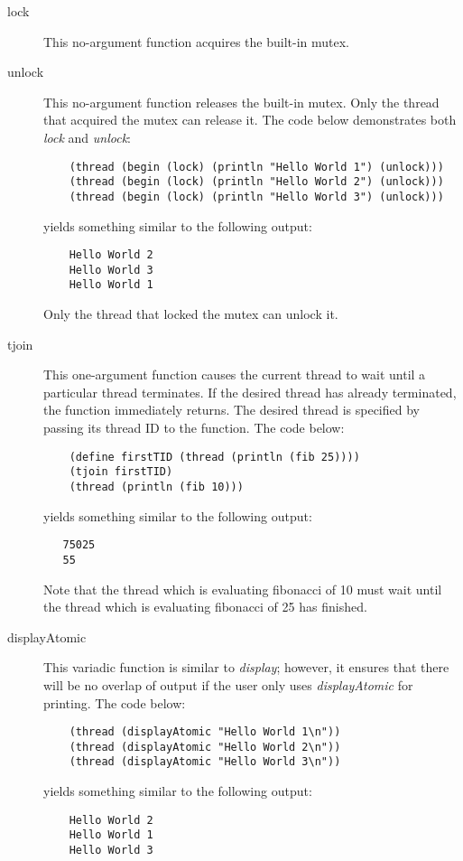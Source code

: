 \begin{description}
\item[lock]
This no-argument function acquires the built-in mutex.

\item[unlock]
This no-argument function releases the built-in mutex.
Only the thread that acquired the mutex can release it.
The code below demonstrates both {\it lock} and {\it unlock}:

\begin{verbatim}
    (thread (begin (lock) (println "Hello World 1") (unlock)))
    (thread (begin (lock) (println "Hello World 2") (unlock)))
    (thread (begin (lock) (println "Hello World 3") (unlock)))
\end{verbatim} 

yields something similar to the following output:

\begin{verbatim}
    Hello World 2
    Hello World 3
    Hello World 1
\end{verbatim} 

Only the thread that locked the mutex can unlock it.

\item[tjoin]
This one-argument function causes the current thread to wait until
a particular thread terminates. If the desired thread has already
terminated, the function immediately returns. The desired thread is
specified by passing its thread ID to the function.  The code below:

\begin{verbatim}
    (define firstTID (thread (println (fib 25))))
    (tjoin firstTID)
    (thread (println (fib 10)))
\end{verbatim} 

yields something similar to the following output:

\begin{verbatim}
   75025
   55
\end{verbatim} 

Note that the thread which is evaluating fibonacci of 10 must wait until
the thread which is evaluating fibonacci of 25 has finished.

\item[displayAtomic]
This variadic function is similar to {\it display}; however, it ensures
that there will be no overlap of output if the user only uses {\it
displayAtomic} for printing.  The code below:

\begin{verbatim}
    (thread (displayAtomic "Hello World 1\n"))
    (thread (displayAtomic "Hello World 2\n"))
    (thread (displayAtomic "Hello World 3\n"))
\end{verbatim} 

yields something similar to the following output:

\begin{verbatim}
    Hello World 2
    Hello World 1
    Hello World 3
\end{verbatim} 

\end{description}

